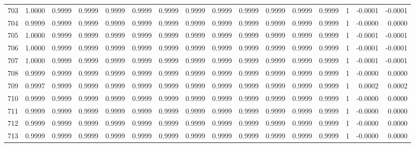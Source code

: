 \begin{tabular}{lrrrrrrrrrrrrrrr}
703 &      1.0000 &  0.9999 &  0.9999 &  0.9999 &  0.9999 &  0.9999 &  0.9999 &  0.9999 &  0.9999 &  0.9999 &   0.9999 &     0.9999 &      1 &                   -0.0001 &                    -0.0001 \\
704 &      0.9999 &  0.9999 &  0.9999 &  0.9999 &  0.9999 &  0.9999 &  0.9999 &  0.9999 &  0.9999 &  0.9999 &   0.9999 &     0.9999 &      1 &                   -0.0000 &                     0.0000 \\
705 &      1.0000 &  0.9999 &  0.9999 &  0.9999 &  0.9999 &  0.9999 &  0.9999 &  0.9999 &  0.9999 &  0.9999 &   0.9999 &     0.9999 &      1 &                   -0.0001 &                    -0.0001 \\
706 &      1.0000 &  0.9999 &  0.9999 &  0.9999 &  0.9999 &  0.9999 &  0.9999 &  0.9999 &  0.9999 &  0.9999 &   0.9999 &     0.9999 &      1 &                   -0.0001 &                    -0.0001 \\
707 &      1.0000 &  0.9999 &  0.9999 &  0.9999 &  0.9999 &  0.9999 &  0.9999 &  0.9999 &  0.9999 &  0.9999 &   0.9999 &     0.9999 &      1 &                   -0.0001 &                    -0.0001 \\
708 &      0.9999 &  0.9999 &  0.9999 &  0.9999 &  0.9999 &  0.9999 &  0.9999 &  0.9999 &  0.9999 &  0.9999 &   0.9999 &     0.9999 &      1 &                   -0.0000 &                     0.0000 \\
709 &      0.9997 &  0.9999 &  0.9999 &  0.9999 &  0.9999 &  0.9999 &  0.9999 &  0.9999 &  0.9999 &  0.9999 &   0.9999 &     0.9999 &      1 &                    0.0002 &                     0.0002 \\
710 &      0.9999 &  0.9999 &  0.9999 &  0.9999 &  0.9999 &  0.9999 &  0.9999 &  0.9999 &  0.9999 &  0.9999 &   0.9999 &     0.9999 &      1 &                   -0.0000 &                     0.0000 \\
711 &      0.9999 &  0.9999 &  0.9999 &  0.9999 &  0.9999 &  0.9999 &  0.9999 &  0.9999 &  0.9999 &  0.9999 &   0.9999 &     0.9999 &      1 &                   -0.0000 &                     0.0000 \\
712 &      0.9999 &  0.9999 &  0.9999 &  0.9999 &  0.9999 &  0.9999 &  0.9999 &  0.9999 &  0.9999 &  0.9999 &   0.9999 &     0.9999 &      1 &                   -0.0000 &                     0.0000 \\
713 &      0.9999 &  0.9999 &  0.9999 &  0.9999 &  0.9999 &  0.9999 &  0.9999 &  0.9999 &  0.9999 &  0.9999 &   0.9999 &     0.9999 &      1 &                   -0.0000 &                     0.0000 \\

\end{tabular}
